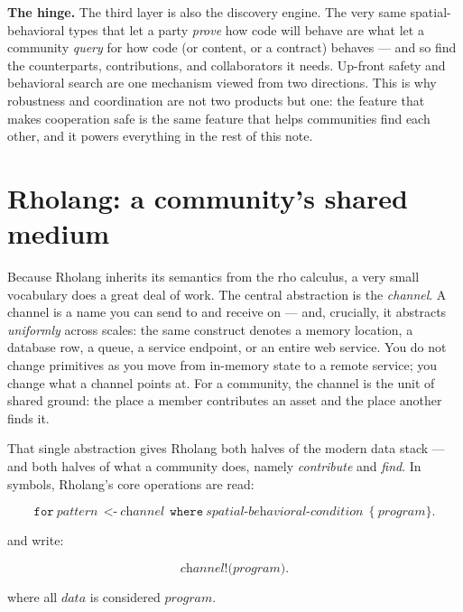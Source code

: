 \documentclass[11pt]{article}
\begin{document}
\begin{keybox}
\textbf{The hinge.} The third layer is also the discovery engine. The very same spatial-behavioral types that let a party \emph{prove} how code will behave are what let a community \emph{query} for how code (or content, or a contract) behaves --- and so find the counterparts, contributions, and collaborators it needs. Up-front safety and behavioral search are one mechanism viewed from two directions. This is why robustness and coordination are not two products but one: the feature that makes cooperation safe is the same feature that helps communities find each other, and it powers everything in the rest of this note.
\end{keybox}

\section{Rholang: a community's shared medium}\label{sec:rholang}

Because Rholang inherits its semantics from the rho calculus, a very small vocabulary does a great deal of work. The central abstraction is the \emph{channel}. A channel is a name you can send to and receive on --- and, crucially, it abstracts \emph{uniformly} across scales: the same construct denotes a memory location, a database row, a queue, a service endpoint, or an entire web service. You do not change primitives as you move from in-memory state to a remote service; you change what a channel points at. For a community, the channel is the unit of shared ground: the place a member contributes an asset and the place another finds it.

That single abstraction gives Rholang both halves of the modern data stack --- and both halves of what a community does, namely \emph{contribute} and \emph{find}. In symbols, Rholang's core operations are read:

\[
\texttt{for}\ \textit{pattern}\ \ \texttt{<-}\ \textit{channel}\ \ \texttt{where}\ \textit{spatial-behavioral-condition}\ \ \texttt{\{}\ \textit{program}\texttt{\}}.
\]

and write:

\[
\textit{channel}\texttt{!}\textit{(program)}.
\]

where all $data$ is considered $program$.
\end{document}
